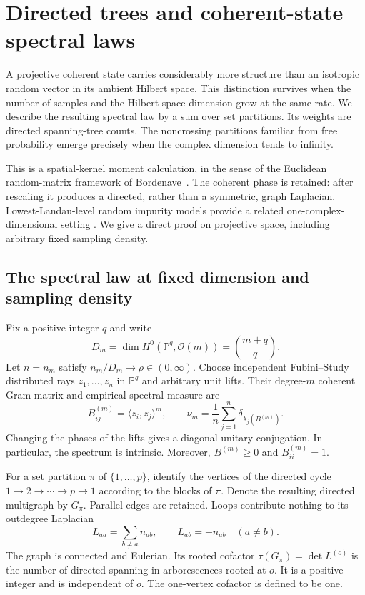 \section{Directed trees and coherent-state spectral laws}
\label{sec:coherent-spectrum}

A projective coherent state carries considerably more structure than an
isotropic random vector in its ambient Hilbert space.  This distinction
survives when the number of samples and the Hilbert-space dimension grow
at the same rate.  We describe the resulting spectral law by a sum over
set partitions.  Its weights are directed spanning-tree counts.  The
noncrossing partitions familiar from free probability emerge precisely
when the complex dimension tends to infinity.

This is a spatial-kernel moment calculation, in the sense of the
Euclidean random-matrix framework of Bordenave~\cite{prob_bordenave2008}.
The coherent phase is retained: after rescaling it produces a directed,
rather than a symmetric, graph Laplacian.  Lowest-Landau-level random
impurity models provide a related one-complex-dimensional setting
\cite{prob_brezin1984}.  We give a direct proof on projective space,
including arbitrary fixed sampling density.

\subsection{The spectral law at fixed dimension and sampling density}

Fix a positive integer $q$ and write
\[
 D_m=\dim H^0(\mathbb P^q,\mathcal O(m))=\binom{m+q}{q}.
\]
Let $n=n_m$ satisfy $n_m/D_m\longrightarrow\rho\in(0,\infty)$.
Choose independent Fubini--Study distributed rays $z_1,\ldots,z_n$
in $\mathbb P^q$ and arbitrary unit lifts.  Their degree-$m$ coherent
Gram matrix and empirical spectral measure are
\begin{equation}
 B^{(m)}_{ij}=\langle z_i,z_j\rangle^m,
 \qquad
 \nu_m=\frac1n\sum_{j=1}^n\delta_{\lambda_j(B^{(m)})}.
 \label{eq:coherent-gram-definition}
\end{equation}
Changing the phases of the lifts gives a diagonal unitary conjugation.
In particular, the spectrum is intrinsic.  Moreover, $B^{(m)}\geq0$
and $B^{(m)}_{ii}=1$.

For a set partition $\pi$ of $\{1,\ldots,p\}$, identify the vertices
of the directed cycle $1\to2\to\cdots\to p\to1$ according to the
blocks of $\pi$.  Denote the resulting directed multigraph by $G_\pi$.
Parallel edges are retained.  Loops contribute nothing to its
outdegree Laplacian
\[
 L_{aa}=\sum_{b\ne a}n_{ab},\qquad L_{ab}=-n_{ab}\quad(a\ne b).
\]
The graph is connected and Eulerian.  Its rooted cofactor
$\tau(G_\pi)=\det L^{(o)}$ is the number of directed spanning
in-arborescences rooted at $o$.  It is a positive integer and is
independent of $o$.  The one-vertex cofactor is defined to be one.

